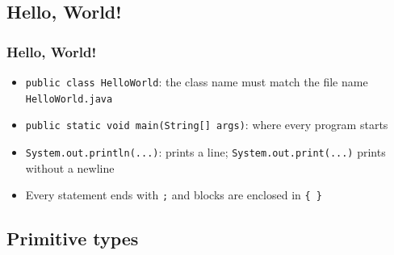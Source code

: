 \documentclass[aspectratio=169,10pt,compress]{beamer}
\begin{document}

\subsection[Hello]{Hello, World!}




\begin{frame}[t,fragile] \frametitle{Hello, World!}

  \begin{itemize}\small
    \item \texttt{public class HelloWorld}: the class name must match the file name \texttt{HelloWorld.java}
    \item \texttt{public static void main(String[] args)}: where every program starts
    \item \texttt{System.out.println(...)}: prints a line; \texttt{System.out.print(...)} prints without a newline
    \item Every statement ends with \texttt{;} and blocks are enclosed in \texttt{\{ \}}
  \end{itemize}
\end{frame}


\subsection[Types]{Primitive types}
\end{document}
